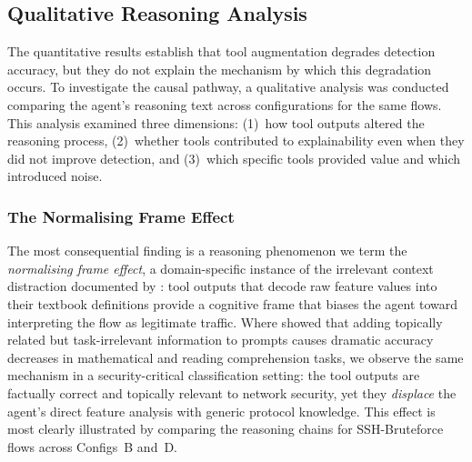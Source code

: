 \documentclass[../main.tex]{subfiles}
\begin{document}
\subsection{Qualitative Reasoning Analysis}
\label{sec:mcp-qualitative}

The quantitative results establish that tool augmentation degrades detection accuracy, but they do not explain the mechanism by which this degradation occurs. To investigate the causal pathway, a qualitative analysis was conducted comparing the agent's reasoning text across configurations for the same flows. This analysis examined three dimensions: (1)~how tool outputs altered the reasoning process, (2)~whether tools contributed to explainability even when they did not improve detection, and (3)~which specific tools provided value and which introduced noise.

\subsubsection{The Normalising Frame Effect}

The most consequential finding is a reasoning phenomenon we term the \textit{normalising frame effect}, a domain-specific instance of the irrelevant context distraction documented by \textcite{Shi2023}: tool outputs that decode raw feature values into their textbook definitions provide a cognitive frame that biases the agent toward interpreting the flow as legitimate traffic. Where \citeauthor{Shi2023} showed that adding topically related but task-irrelevant information to prompts causes dramatic accuracy decreases in mathematical and reading comprehension tasks, we observe the same mechanism in a security-critical classification setting: the tool outputs are factually correct and topically relevant to network security, yet they \textit{displace} the agent's direct feature analysis with generic protocol knowledge. This effect is most clearly illustrated by comparing the reasoning chains for SSH-Bruteforce flows across Configs~B and~D.
\end{document}
